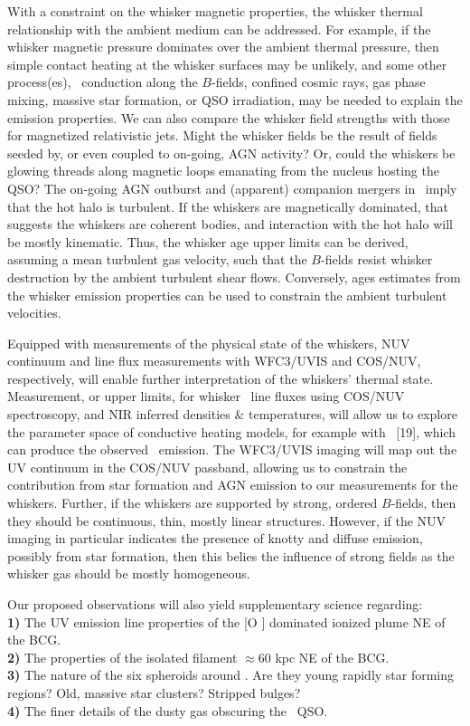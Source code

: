 \documentclass[12pt]{article}
\begin{document}
With a constraint on the whisker magnetic properties, the whisker
thermal relationship with the ambient medium can be addressed. For
example, if the whisker magnetic pressure dominates over the ambient
thermal pressure, then simple contact heating at the whisker surfaces
may be unlikely, and some other process(es), \eg\ conduction along the
$B$-fields, confined cosmic rays, gas phase mixing, massive star
formation, or QSO irradiation, may be needed to explain the emission
properties. We can also compare the whisker field strengths with those
for magnetized relativistic jets. Might the whisker fields be the
result of fields seeded by, or even coupled to on-going, AGN activity?
Or, could the whiskers be glowing threads along magnetic loops
emanating from the nucleus hosting the QSO? The on-going AGN outburst
and (apparent) companion mergers in \irs\ imply that the hot halo is
turbulent. If the whiskers are magnetically dominated, that suggests
the whiskers are coherent bodies, and interaction with the hot halo
will be mostly kinematic. Thus, the whisker age upper limits can be
derived, assuming a mean turbulent gas velocity, such that the
$B$-fields resist whisker destruction by the ambient turbulent shear
flows. Conversely, ages estimates from the whisker emission properties
can be used to constrain the ambient turbulent velocities.

Equipped with measurements of the physical state of the whiskers, NUV
continuum and line flux measurements with WFC3/UVIS and COS/NUV,
respectively, will enable further interpretation of the whiskers'
thermal state. Measurement, or upper limits, for whisker \civ\ line
fluxes using COS/NUV spectroscopy, and NIR inferred densities \&
temperatures, will allow us to explore the parameter space of
conductive heating models, for example with \cloudy\ [19], which can
produce the observed \civ\ emission. The WFC3/UVIS imaging will map
out the UV continuum in the COS/NUV passband, allowing us to constrain
the contribution from star formation and AGN emission to our
measurements for the whiskers. Further, if the whiskers are supported
by strong, ordered $B$-fields, then they should be continuous, thin,
mostly linear structures. However, if the NUV imaging in particular
indicates the presence of knotty and diffuse emission, possibly from
star formation, then this belies the influence of strong fields as the
whisker gas should be mostly homogeneous.

Our proposed observations will also yield supplementary science
regarding:\\
{\bf{1)}} The UV emission line properties of the [O ]
dominated ionized plume NE of the BCG.\\
{\bf{2)}} The properties of the isolated filament $\approx 60$ kpc NE
of the BCG.\\
{\bf{3)}} The nature of the six spheroids around \irs. Are they young
rapidly star forming regions? Old, massive star clusters? Stripped
bulges?\\
{\bf{4)}} The finer details of the dusty gas obscuring the
\irs\ QSO.
\end{document}

